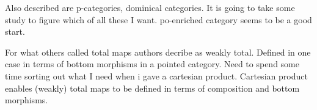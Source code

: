 \documentclass[14pt,a4paper]{scrartcl}
\begin{document}
Also described are p-categories, dominical categories. It is going to take some study to figure which of all these I want.
po-enriched category seems to be a good start. 

For what others called total maps authors decribe as weakly total. Defined in one case in 
terms of bottom morphisms in a pointed category. Need to spend some time sorting out what I need when i gave a cartesian product. Cartesian product enables (weakly) total maps to be defined in terms of composition and bottom morphisms. 
  

\end{document}
